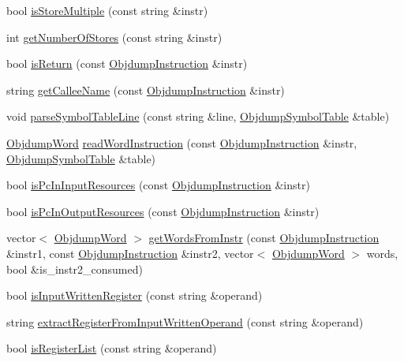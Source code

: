 \begin{DoxyCompactItemize}
\item 
bool \hyperlink{classMIPS_a781bec4f737ea512ada3f3fa166463c9}{is\+Store\+Multiple} (const string \&instr)
\item 
int \hyperlink{classMIPS_a8555188088fbf6dba02c37ca43e036c6}{get\+Number\+Of\+Stores} (const string \&instr)
\item 
bool \hyperlink{classMIPS_af2307adac1cb8289cb7510829051f45d}{is\+Return} (const \hyperlink{classObjdumpInstruction}{Objdump\+Instruction} \&instr)
\item 
string \hyperlink{classMIPS_adc2a687a1c64a5240d7d1ce7e294fdfc}{get\+Callee\+Name} (const \hyperlink{classObjdumpInstruction}{Objdump\+Instruction} \&instr)
\item 
void \hyperlink{classMIPS_ae63e651cee1687716908f3c9f66d9f3f}{parse\+Symbol\+Table\+Line} (const string \&line, \hyperlink{classObjdumpSymbolTable}{Objdump\+Symbol\+Table} \&table)
\item 
\hyperlink{classObjdumpWord}{Objdump\+Word} \hyperlink{classMIPS_a28a3d7f0cc8a69881d46dfa1363351cf}{read\+Word\+Instruction} (const \hyperlink{classObjdumpInstruction}{Objdump\+Instruction} \&instr, \hyperlink{classObjdumpSymbolTable}{Objdump\+Symbol\+Table} \&table)
\item 
bool \hyperlink{classMIPS_affd67799c774ea1ca747f15d7a483a8c}{is\+Pc\+In\+Input\+Resources} (const \hyperlink{classObjdumpInstruction}{Objdump\+Instruction} \&instr)
\item 
bool \hyperlink{classMIPS_a68497c5e46c6106133d4bf5a01db6e7d}{is\+Pc\+In\+Output\+Resources} (const \hyperlink{classObjdumpInstruction}{Objdump\+Instruction} \&instr)
\item 
vector$<$ \hyperlink{classObjdumpWord}{Objdump\+Word} $>$ \hyperlink{classMIPS_a1e122412b5edefe1b92b2b4851255a69}{get\+Words\+From\+Instr} (const \hyperlink{classObjdumpInstruction}{Objdump\+Instruction} \&instr1, const \hyperlink{classObjdumpInstruction}{Objdump\+Instruction} \&instr2, vector$<$ \hyperlink{classObjdumpWord}{Objdump\+Word} $>$ words, bool \&is\+\_\+instr2\+\_\+consumed)
\item 
bool \hyperlink{classMIPS_a9bdb629497575a212f34ee951f1adfe0}{is\+Input\+Written\+Register} (const string \&operand)
\item 
string \hyperlink{classMIPS_a53017c6d42bb7bee24a36e45bf0300b9}{extract\+Register\+From\+Input\+Written\+Operand} (const string \&operand)
\item 
bool \hyperlink{classMIPS_aa1efaf59e1d461388886db68f5e54e06}{is\+Register\+List} (const string \&operand)

\end{DoxyCompactItemize}
